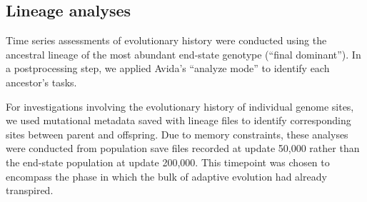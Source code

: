 \subsection{Lineage analyses}


Time series assessments of evolutionary history were conducted using the ancestral lineage of the most abundant end-state genotype (``final dominant'').
In a postprocessing step, we applied Avida's ``analyze mode'' to identify each ancestor's tasks.

For investigations involving the evolutionary history of individual genome sites, we used mutational metadata saved with lineage files to identify corresponding sites between parent and offspring.
Due to memory constraints, these analyses were conducted from population save files recorded at update 50,000 rather than the end-state population at update 200,000.
This timepoint was chosen to encompass the phase in which the bulk of adaptive evolution had already transpired.


